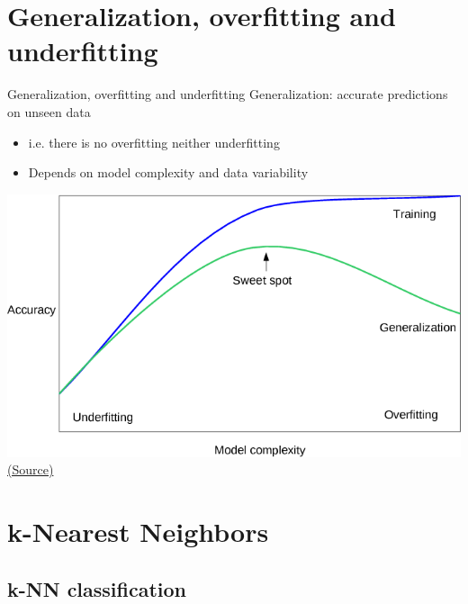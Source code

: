 \documentclass[10pt,compress]{beamer} %
\begin{document}
\section[Generalization]{Generalization, overfitting and underfitting}
\begin{frame}{Generalization, overfitting and underfitting}
    Generalization: accurate predictions on unseen data
    \begin{itemize}
	\item i.e. there is no overfitting neither underfitting
	\item Depends on model  complexity and data variability
    \end{itemize}

    \medskip

    \centering \includegraphics[width=0.6\linewidth]{figs/overfitting_underfitting_cartoon.png}\\
    \tiny{\href{https://github.com/amueller/introduction_to_ml_with_python/blob/master/02-supervised-learning.ipynb}{(Source)}}
\end{frame}



\section{k-Nearest Neighbors}
\subsection{k-NN classification}
\end{document}
